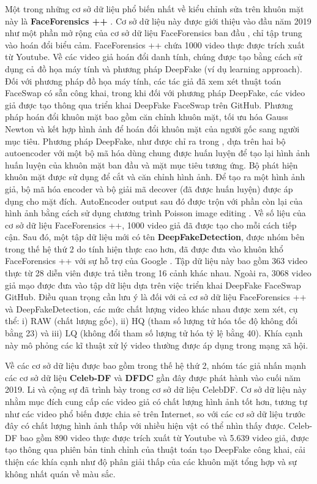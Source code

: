 \documentclass{article}
\begin{document}
Một trong những cơ sở dữ liệu phổ biến nhất về kiểu chỉnh sửa trên khuôn mặt này là \textbf{FaceForensics ++} . Cơ sở dữ liệu này được giới thiệu vào đầu năm 2019 như một phần mở rộng của cơ sở dữ liệu FaceForensics ban đầu , chỉ tập trung vào hoán đổi biểu cảm. FaceForensics ++ chứa 1000 video thực được trích xuất từ Youtube. Về các video giả hoán đổi danh tính, chúng được tạo bằng cách sử dụng cả đồ họa máy tính và phương pháp DeepFake (ví dụ learning approach). Đối với phương pháp đồ họa máy tính, các tác giả đã xem xét thuật toán FaceSwap có sẵn công khai, trong khi đối với phương pháp DeepFake, các video giả được tạo thông qua triển khai DeepFake FaceSwap trên GitHub. Phương pháp hoán đổi khuôn mặt bao gồm căn chỉnh khuôn mặt, tối ưu hóa Gauss Newton và kết hợp hình ảnh để hoán đổi khuôn mặt của người gốc sang người mục tiêu. Phương pháp DeepFake, như được chỉ ra trong , dựa trên hai bộ autoencoder với một bộ mã hóa dùng chung được huấn luyện để tạo lại hình ảnh huấn luyện của khuôn mặt ban đầu và mặt mục tiêu tương ứng. Bộ phát hiện khuôn mặt được sử dụng để cắt và căn chỉnh hình ảnh. Để tạo ra một hình ảnh giả, bộ mã hóa encoder và bộ giải mã decover (đã được huấn luyện) được áp dụng cho mặt đích. AutoEncoder output sau đó được trộn với phần còn lại của hình ảnh bằng cách sử dụng chương trình Poisson image editing . Về số liệu của cơ sở dữ liệu FaceForensics ++, 1000 video giả đã được tạo cho mỗi cách tiếp cận. Sau đó, một tập dữ liệu mới có tên \textbf{DeepFakeDetection}, được nhóm bên trong thế hệ thứ 2 do tính hiện thực cao hơn, đã được đưa vào khuôn khổ FaceForensics ++ với sự hỗ trợ của Google . Tập dữ liệu này bao gồm 363 video thực từ 28 diễn viên được trả tiền trong 16 cảnh khác nhau. Ngoài ra, 3068 video giả mạo được đưa vào tập dữ liệu dựa trên việc triển khai DeepFake FaceSwap GitHub. Điều quan trọng cần lưu ý là đối với cả cơ sở dữ liệu FaceForensics ++ và DeepFakeDetection, các mức chất lượng video khác nhau được xem xét, cụ thể: i) RAW (chất lượng gốc), ii) HQ (tham số lượng tử hóa tốc độ không đổi bằng 23) và iii) LQ (không đổi tham số lượng tử hóa tỷ lệ bằng 40). Khía cạnh này mô phỏng các kĩ thuật xử lý video thường được áp dụng trong mạng xã hội.

Về các cơ sở dữ liệu được bao gồm trong thế hệ thứ 2, nhóm tác giả nhấn mạnh các cơ sở dữ liệu \textbf{Celeb-DF} và \textbf{DFDC }gần đây được phát hành vào cuối năm 2019. Li và cộng sự đã trình bày trong  cơ sở dữ liệu CelebDF. Cơ sở dữ liệu này nhằm mục đích cung cấp các video giả có chất lượng hình ảnh tốt hơn, tương tự như các video phổ biến được chia sẻ trên Internet, so với các cơ sở dữ liệu trước đây có chất lượng hình ảnh thấp với nhiều hiện vật có thể nhìn thấy được. Celeb-DF bao gồm 890 video thực được trích xuất từ Youtube và 5.639 video giả, được tạo thông qua phiên bản tinh chỉnh của thuật toán tạo DeepFake công khai, cải thiện các khía cạnh như độ phân giải thấp của các khuôn mặt tổng hợp và sự không nhất quán về màu sắc.
\end{document}
